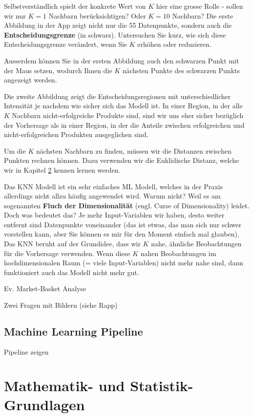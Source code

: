 \documentclass[
]{book}
\begin{document}
Selbstverständlich spielt der konkrete Wert von \(K\) hier eine grosse Rolle - sollen wir nur \(K=1\) Nachbarn berücksichtigen? Oder \(K=10\) Nachbarn? Die erste Abbildung in der App zeigt nicht nur die 55 Datenpunkte, sondern auch die \textbf{Entscheidungsgrenze} (in schwarz). Untersuchen Sie kurz, wie sich diese Entscheidungsgrenze verändert, wenn Sie \(K\) erhöhen oder reduzieren.

Ausserdem können Sie in der ersten Abbildung auch den schwarzen Punkt mit der Maus setzen, wodurch Ihnen die \(K\) nächsten Punkte des schwarzen Punkts angezeigt werden.

Die zweite Abbildung zeigt die Entscheidungsregionen mit unterschiedlicher Intensität je nachdem wie sicher sich das Modell ist. In einer Region, in der alle \(K\) Nachbarn nicht-erfolgreiche Produkte sind, sind wir uns eher sicher bezüglich der Vorhersage als in einer Region, in der die Anteile zwischen erfolgreichen und nicht-erfolgreichen Produkten ausgeglichen sind.

Um die \(K\) nächsten Nachbarn zu finden, müssen wir die Distanzen zwischen Punkten rechnen können. Dazu verwenden wir die Euklidische Distanz, welche wir in Kapitel \ref{basics} kennen lernen werden.

Das KNN Modell ist ein sehr einfaches ML Modell, welches in der Praxis allerdings nicht allzu häufig angewendet wird. Warum nicht? Weil es am sogenannten \textbf{Fluch der Dimensionalität} (engl. Curse of Dimensionality) leidet. Doch was bedeutet das? Je mehr Input-Variablen wir haben, desto weiter entfernt sind Datenpunkte voneinander (das ist etwas, das man sich nur schwer vorstellen kann, aber Sie können es mir für den Moment einfach mal glauben). Das KNN beruht auf der Grundidee, dass wir \(K\) nahe, ähnliche Beobachtungen für die Vorhersage verwenden. Wenn diese \(K\) nahen Beobachtungen im hochdimensionalen Raum (= viele Input-Variablen) nicht mehr nahe sind, dann funktioniert auch das Modell nicht mehr gut.

Ev. Market-Basket Analyse

Zwei Fragen mit Bildern (siehe Rapp)

\hypertarget{machine-learning-pipeline}{%
\section{Machine Learning Pipeline}\label{machine-learning-pipeline}}

Pipeline zeigen

\hypertarget{basics}{%
\chapter{Mathematik- und Statistik-Grundlagen}\label{basics}}
\end{document}
